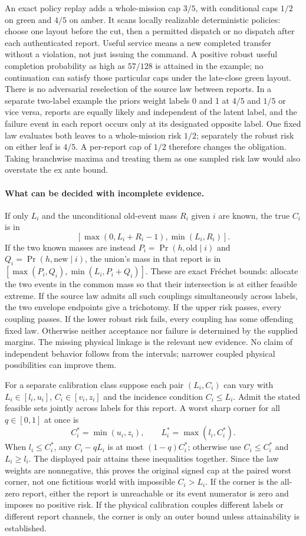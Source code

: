 \documentclass{article}
\begin{document}
An exact policy replay adds a whole-mission cap $3/5$, with conditional caps $1/2$ on green and $4/5$ on amber. It scans locally realizable deterministic policies: choose one layout before the cut, then a permitted dispatch or no dispatch after each authenticated report. Useful service means a new completed transfer without a violation, not just issuing the command. A positive robust useful completion probability as high as $57/128$ is attained in the example; no continuation can satisfy those particular caps under the late-close green layout. There is no adversarial reselection of the source law between reports. In a separate two-label example the priors weight labels 0 and 1 at $4/5$ and $1/5$ or vice versa, reports are equally likely and independent of the latent label, and the failure event in each report occurs only at its designated opposite label. One fixed law evaluates both leaves to a whole-mission risk $1/2$; separately the robust risk on either leaf is $4/5$. A per-report cap of $1/2$ therefore changes the obligation. Taking branchwise maxima and treating them as one sampled risk law would also overstate the ex ante bound.

\paragraph{What can be decided with incomplete evidence.}
If only $L_i$ and the unconditional old-event mass $R_i$ given $i$ are known, the true $C_i$ is in
\[
[\max(0,L_i+R_i-1),\min(L_i,R_i)].
\]
If the two known masses are instead $P_i=\Pr(h,\mathrm{old}\mid i)$ and $Q_i=\Pr(h,\mathrm{new}\mid i)$, the union's mass in that report is in $[\max(P_i,Q_i),\min(L_i,P_i+Q_i)]$. These are exact Fréchet bounds: allocate the two events in the common mass so that their intersection is at either feasible extreme. If the source law admits all such couplings simultaneously across labels, the two envelope endpoints give a trichotomy. If the upper risk passes, every coupling passes. If the lower robust risk fails, every coupling has some offending fixed law. Otherwise neither acceptance nor failure is determined by the supplied margins. The missing physical linkage is the relevant new evidence. No claim of independent behavior follows from the intervals; narrower coupled physical possibilities can improve them.

For a separate calibration class suppose each pair $(L_i,C_i)$ can vary with $L_i\in [l_i,u_i]$, $C_i\in[v_i,z_i]$ and the incidence condition $C_i\le L_i$. Admit the stated feasible sets jointly across labels for this report. A worst sharp corner for all $q\in[0,1]$ at once is
\[
 C_i^*=\min(u_i,z_i),\qquad L_i^*=\max(l_i,C_i^*).
\]
When $l_i\le C_i^*$, any $C_i-qL_i$ is at most $(1-q)C_i^*$; otherwise use $C_i\le C_i^*$ and $L_i\ge l_i$. The displayed pair attains these inequalities together. Since the law weights are nonnegative, this proves the original signed cap at the paired worst corner, not one fictitious world with impossible $C_i>L_i$. If the corner is the all-zero report, either the report is unreachable or its event numerator is zero and imposes no positive risk. If the physical calibration couples different labels or different report channels, the corner is only an outer bound unless attainability is established.
\end{document}
